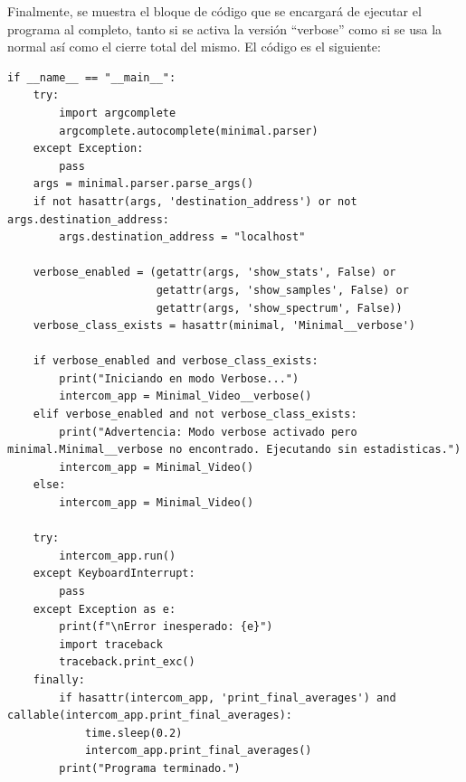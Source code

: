 Finalmente, se muestra el bloque de código que se encargará de ejecutar el programa al completo, tanto si se activa la versión ``verbose'' como si se usa la normal así como el cierre total del mismo. El código es el siguiente:
\begin{lstlisting}[style=pythonstyle, caption={Bloque de ejecución del main() de \textit{Minimal\_Video.py}}, label={lst:main_minimal_video}]
if __name__ == "__main__":
    try:
        import argcomplete
        argcomplete.autocomplete(minimal.parser)
    except Exception:
        pass
    args = minimal.parser.parse_args()
    if not hasattr(args, 'destination_address') or not args.destination_address:
        args.destination_address = "localhost"

    verbose_enabled = (getattr(args, 'show_stats', False) or
                       getattr(args, 'show_samples', False) or
                       getattr(args, 'show_spectrum', False))
    verbose_class_exists = hasattr(minimal, 'Minimal__verbose')

    if verbose_enabled and verbose_class_exists:
        print("Iniciando en modo Verbose...")
        intercom_app = Minimal_Video__verbose()
    elif verbose_enabled and not verbose_class_exists:
        print("Advertencia: Modo verbose activado pero minimal.Minimal__verbose no encontrado. Ejecutando sin estadisticas.")
        intercom_app = Minimal_Video()
    else:
        intercom_app = Minimal_Video()

    try:
        intercom_app.run()
    except KeyboardInterrupt:
        pass
    except Exception as e:
        print(f"\nError inesperado: {e}")
        import traceback
        traceback.print_exc()
    finally:
        if hasattr(intercom_app, 'print_final_averages') and callable(intercom_app.print_final_averages):
            time.sleep(0.2)
            intercom_app.print_final_averages()
        print("Programa terminado.")
\end{lstlisting}
\vspace{\baselineskip}

